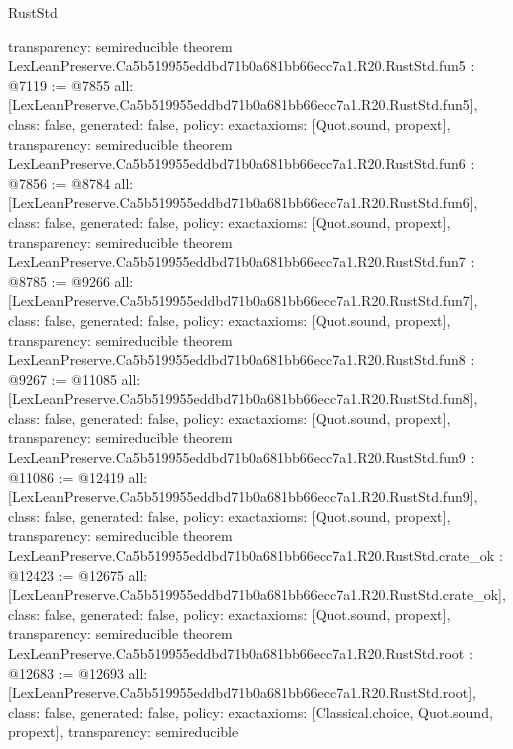 \begin{lexlean}{RustStd}
\begin{coremodule}
{  transparency: semireducible
}
theorem LexLeanPreserve.Ca5b519955eddbd71b0a681bb66ecc7a1.R20.RustStd.fun5 : @7119 := @7855 {
  all: [LexLeanPreserve.Ca5b519955eddbd71b0a681bb66ecc7a1.R20.RustStd.fun5],
  class: false,
  generated: false,
  policy: exact{axioms: [Quot.sound, propext]},
  transparency: semireducible
}
theorem LexLeanPreserve.Ca5b519955eddbd71b0a681bb66ecc7a1.R20.RustStd.fun6 : @7856 := @8784 {
  all: [LexLeanPreserve.Ca5b519955eddbd71b0a681bb66ecc7a1.R20.RustStd.fun6],
  class: false,
  generated: false,
  policy: exact{axioms: [Quot.sound, propext]},
  transparency: semireducible
}
theorem LexLeanPreserve.Ca5b519955eddbd71b0a681bb66ecc7a1.R20.RustStd.fun7 : @8785 := @9266 {
  all: [LexLeanPreserve.Ca5b519955eddbd71b0a681bb66ecc7a1.R20.RustStd.fun7],
  class: false,
  generated: false,
  policy: exact{axioms: [Quot.sound, propext]},
  transparency: semireducible
}
theorem LexLeanPreserve.Ca5b519955eddbd71b0a681bb66ecc7a1.R20.RustStd.fun8 : @9267 := @11085 {
  all: [LexLeanPreserve.Ca5b519955eddbd71b0a681bb66ecc7a1.R20.RustStd.fun8],
  class: false,
  generated: false,
  policy: exact{axioms: [Quot.sound, propext]},
  transparency: semireducible
}
theorem LexLeanPreserve.Ca5b519955eddbd71b0a681bb66ecc7a1.R20.RustStd.fun9 : @11086 := @12419 {
  all: [LexLeanPreserve.Ca5b519955eddbd71b0a681bb66ecc7a1.R20.RustStd.fun9],
  class: false,
  generated: false,
  policy: exact{axioms: [Quot.sound, propext]},
  transparency: semireducible
}
theorem LexLeanPreserve.Ca5b519955eddbd71b0a681bb66ecc7a1.R20.RustStd.crate_ok : @12423 := @12675 {
  all: [LexLeanPreserve.Ca5b519955eddbd71b0a681bb66ecc7a1.R20.RustStd.crate_ok],
  class: false,
  generated: false,
  policy: exact{axioms: [Quot.sound, propext]},
  transparency: semireducible
}
theorem LexLeanPreserve.Ca5b519955eddbd71b0a681bb66ecc7a1.R20.RustStd.root : @12683 := @12693 {
  all: [LexLeanPreserve.Ca5b519955eddbd71b0a681bb66ecc7a1.R20.RustStd.root],
  class: false,
  generated: false,
  policy: exact{axioms: [Classical.choice, Quot.sound, propext]},
  transparency: semireducible
}


\end{coremodule}
\end{lexlean}
